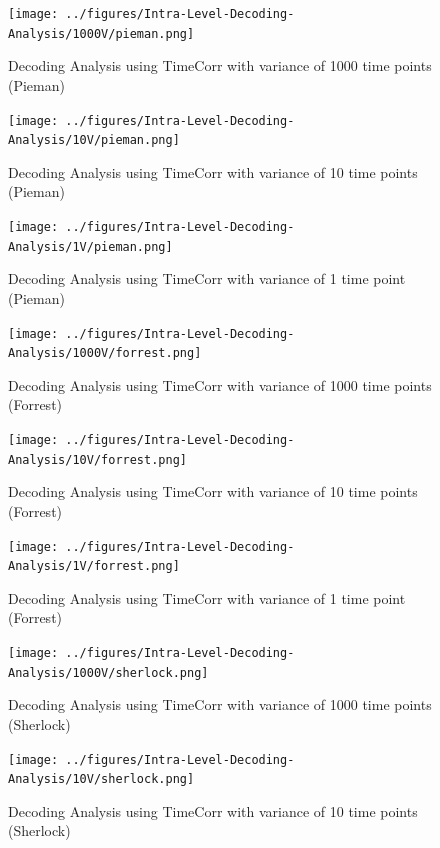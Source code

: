 \documentclass[11pt]{article}
\begin{document}
\begin{figure}[!htb]
\caption{Decoding Analysis using TimeCorr with variance of 1000 time points (Pieman)}
\centering
\texttt{[image: ../figures/Intra-Level-Decoding-Analysis/1000V/pieman.png]}
\label{fig:piemanDC1000}
\end{figure}

\begin{figure}[!htb]
\caption{Decoding Analysis using TimeCorr with variance of 10 time points (Pieman)}
\centering
\texttt{[image: ../figures/Intra-Level-Decoding-Analysis/10V/pieman.png]}
\label{fig:piemanDC10}
\end{figure}

\begin{figure}[!htb]
\caption{Decoding Analysis using TimeCorr with variance of 1 time point (Pieman)}
\centering
\texttt{[image: ../figures/Intra-Level-Decoding-Analysis/1V/pieman.png]}
\label{fig:piemanDC1}
\end{figure}

\begin{figure}[!htb]
\caption{Decoding Analysis using TimeCorr with variance of 1000 time points (Forrest)}
\centering
\texttt{[image: ../figures/Intra-Level-Decoding-Analysis/1000V/forrest.png]}
\label{fig:forrestDC1000}
\end{figure}

\begin{figure}[!htb]
\caption{Decoding Analysis using TimeCorr with variance of 10 time points (Forrest)}
\centering
\texttt{[image: ../figures/Intra-Level-Decoding-Analysis/10V/forrest.png]}
\label{fig:forrestDC10}
\end{figure}

\begin{figure}[!htb]
\caption{Decoding Analysis using TimeCorr with variance of 1 time point (Forrest)}
\centering
\texttt{[image: ../figures/Intra-Level-Decoding-Analysis/1V/forrest.png]}
\label{fig:forrestDC1}
\end{figure}

\begin{figure}[!htb]
\caption{Decoding Analysis using TimeCorr with variance of 1000 time points (Sherlock)}
\centering
\texttt{[image: ../figures/Intra-Level-Decoding-Analysis/1000V/sherlock.png]}
\label{fig:sherlockDC1000}
\end{figure}

\begin{figure}[!htb]
\caption{Decoding Analysis using TimeCorr with variance of 10 time points (Sherlock)}
\centering
\texttt{[image: ../figures/Intra-Level-Decoding-Analysis/10V/sherlock.png]}
\label{fig:sherlockDC10}
\end{figure}
\end{document}
